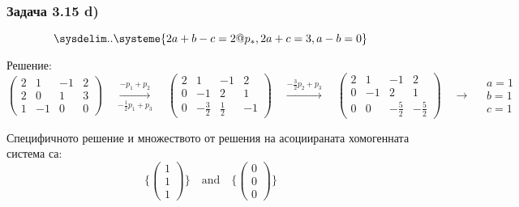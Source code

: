 \documentclass{subfiles}
\begin{document}
\subsubsection{Задача 3.15 d)}

\begin{equation*}
    \sysdelim..\systeme{
        2a + b - c = 2@p_{*},
        2a + c = 3,
        a - b = 0
    }
\end{equation*}

\noindent Решение:
\begin{equation*}
    \left(
        \begin{array}{ ccc|c }
            2 &  1 & -1 & 2 \\
            2 &  0 & 1 & 3  \\
            1 & -1 & 0 & 0
        \end{array}
    \right)
    \quad
    \overset{-p_{1}+p_{2}}{\underset{-\frac{1}{2}p_{1}+p_{3}}{\longrightarrow}}
    \quad
    \left(
        \begin{array}{ ccc|c }
            2 &  1 & -1 & 2 \\
            0 & -1 &  2 & 1  \\
            0 & -\frac{3}{2} & \frac{1}{2} & -1
        \end{array}
    \right)
    \quad
    \overset{-\frac{3}{2}p_{2}+p_{3}}{\longrightarrow}
    \quad
    \left(
        \begin{array}{ ccc|c }
            2 &  1 & -1 & 2 \\
            0 & -1 &  2 & 1  \\
            0 &  0 & -\frac{5}{2} & -\frac{5}{2}
        \end{array}
    \right)
    \quad
    \longrightarrow
    \quad
    \begin{array}{ c }
        a = 1 \\
        b = 1 \\
        c = 1
    \end{array}
\end{equation*}

\noindent Специфичното решение и множеството от решения на асоциираната хомогенната система са:
\begin{equation*}
    \{
        \left(\begin{array}{ c } 1 \\ 1 \\ 1 \end{array}\right)
    \}
    \quad
    \text{and}
    \quad
    \{
        \left(\begin{array}{ c } 0 \\ 0 \\ 0 \end{array}\right)
    \}
\end{equation*}
\end{document}
